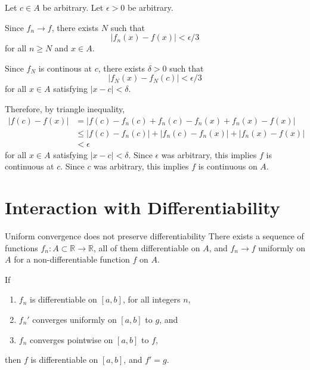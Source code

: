 \begin{dem}{}{}
  Let \(c \in A\) be arbitrary.
  Let \(\epsilon > 0\) be arbitrary.

  Since \(f_n \to f\), there exists \(N\) such that \[
    |f_n(x) - f(x)| < \epsilon/3
  \] for all \(n \geq N\) and \(x \in A\).

  Since \(f_N\) is continous at \(c\), there exists \(\delta > 0\) such that \[
    |f_N(x) - f_N(c)| < \epsilon/3
  \]  for all \(x \in A\) satisfying \(|x - c| < \delta\).

  Therefore, by triangle inequality, 
  \begin{align*}
    |f(c) - f(x)| &= |f(c) - f_n(c) + f_n(c) - f_n(x) + f_n(x) - f(x)| \\
                  &\leq |f(c) - f_n(c)| + |f_n(c) - f_n(x)| + |f_n(x) - f(x)| \\
                  &< \epsilon
  \end{align*}
  for all \(x \in A\) satisfying \(|x - c| < \delta\).
  Since \(\epsilon\) was arbitrary, this implies \(f\) is continuous at \(c\).
  Since \(c\) was arbitrary, this implies \(f\) is continuous on \(A\).
\end{dem}

\section{Interaction with Differentiability}

\begin{prop}{Uniform convergence does not preserve differentiability}{}
  There exists a sequence of functions \(f_n \colon A \subset \mathbb{R} \to \mathbb{R}\), all of them differentiable on \(A\), and \(f_n \to f\) uniformly on \(A\) for a non-differentiable function \(f\) on \(A\).
\end{prop}

\begin{thm}{}{}
  If
  \begin{enumerate}
    \item \(f_n\) is differentiable on \([a, b]\), for all integers \(n\),
    \item \(f_n'\) converges uniformly on \([a, b]\) to \(g\), and
    \item \(f_n\) converges pointwise on \([a, b]\) to \(f\),
  \end{enumerate}
  then \(f\) is differentiable on \([a, b]\), and  \(f'=g\).
\end{thm}
